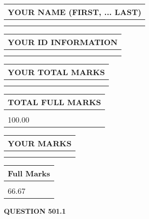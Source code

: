 \documentclass{ctexart}
\begin{document}
   
   
   
\newpage 
\setcounter{page}{ 
   501001 } 
   
   
   
   
\noindent\begin{tabular}{|l|}
\hline
YOUR NAME (FIRST, ... LAST)  \\
\hline
 \\ 
 \\ 
\hline
\end{tabular}
\hspace{0.05in} \begin{tabular}{|l|}
\hline
 YOUR   ID   INFORMATION  \\
\hline
 \\ 
 \\ 
\hline
\end{tabular}
   
   
\vspace{0.2in}\noindent\begin{tabular}{|l|}
\hline
YOUR TOTAL MARKS  \\
\hline
 \\ 
 \\ 
\hline
\end{tabular}
\hspace{0.05in} \begin{tabular}{|l|}
\hline
TOTAL FULL MARKS  \\
\hline
 \\ 
100.00 \\
\hline
\end{tabular}
   
   
 \vspace{0.2in}
 
 
 
 
   
   
  
\vspace{0.2in}
  
\noindent\begin{tabular}{|l|}
\hline
 YOUR MARKS  \\
\hline
 \\ 
 \\ 
\hline
\end{tabular}
\hspace{0.05in} \begin{tabular}{|l|}
\hline
 Full Marks  \\
\hline
 \\ 
66.67 \\
\hline
\end{tabular}
{\textbf{\Large{QUESTION
501.1 
}}}
  
\end{document}
